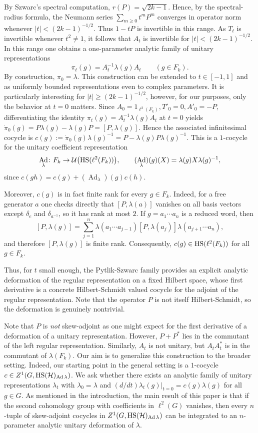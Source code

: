\documentclass[12pt]{amsproc}
\theoremstyle{plain}
\theoremstyle{definition}
\numberwithin{equation}{section}
\newcommand{\HS}{{\rm HS}}
\DeclareMathOperator{\Ad}{Ad}
\begin{document}
By Szwarc's spectral computation, \(r(P)=\sqrt{2k-1}\). Hence, by the
spectral-radius formula, the Neumann series
$
\sum_{m\ge 0} t^m P^m
$
converges in operator norm whenever \(|t|<(2k-1)^{-1/2}\). Thus
\(1-tP\) is invertible in this range.
As $T_t$ is invertible whenever $t^2\neq 1$, it follows that $A_t$ is invertible for
$
|t|<(2k-1)^{-1/2}.
$
In this range one obtains a one-parameter analytic family of unitary representations
\[
\pi_t(g)=A_t^{-1}\lambda(g)A_t \qquad (g\in F_k).
\]
By construction, $\pi_0=\lambda$. This construction can be extended to $t \in [-1,1]$ and as uniformly bounded representations even to complex parameters. It is particularly interesting for $|t| \geq (2k-1)^{-1/2}$, however, for our purposes, only the behavior at $t=0$ matters.
Since
$
A_0=1_{\ell^2(F_k)},  T'_0=0, A'_0=-P,
$
differentiating the identity
$
\pi_t(g)=A_t^{-1}\lambda(g)A_t
$
at $t=0$ yields
$
\dot\pi_0(g)=P\lambda(g)-\lambda(g)P=[P,\lambda(g)].
$
Hence the associated infinitesimal cocycle is
$
c(g):=\dot\pi_0(g)\lambda(g)^{-1}
      =P-\lambda(g)P\lambda(g)^{-1}.
$
This is a $1$-cocycle for the unitary coefficient representation
\[
\Ad_\lambda \colon F_k \to \mathcal U\bigl({\rm HS}(\ell^2(F_k))\bigr),\qquad
(\Ad_\lambda)(g)(X)=\lambda(g)X\lambda(g)^{-1},
\]
since
$
c(gh)=c(g)+(\Ad_\lambda)(g)c(h).
$

Moreover, $c(g)$ is in fact finite rank for every $g\in F_k$.
Indeed, for a free generator $a$ one checks directly that $[P,\lambda(a)]$ vanishes on all basis vectors except $\delta_e$ and $\delta_{a^{-1}}$, so it has rank at most $2$.
If $g=a_1\cdots a_n$ is a reduced word, then
\[
[P,\lambda(g)]
=
\sum_{j=1}^n
\lambda(a_1\cdots a_{j-1})[P,\lambda(a_j)]\lambda(a_{j+1}\cdots a_n),
\]
and therefore $[P,\lambda(g)]$ is finite rank.
Consequently,
$
c(g)\in {\rm HS}(\ell^2(F_k))$ for all $g\in F_k.
$

Thus, for $t$ small enough, the Pytlik-Szwarc family provides an explicit analytic deformation of the regular representation on a fixed Hilbert space, whose first derivative is a concrete Hilbert-Schmidt valued cocycle for the adjoint of the regular representation. Note that the operator $P$ is not itself Hilbert-Schmidt, so the deformation is genuinely nontrivial.

Note that $P$ is \emph{not} skew-adjoint as one might expect for the first derivative of a deformation of a unitary representation. However, $P+P^*$ lies in the commutant of the left regular representation. Similarly, $A_t$ is not unitary, but $A_tA_t^*$ is in the commutant of $\lambda(F_k)$. Our aim is to generalize this construction to the broader setting. Indeed, our starting point in the general setting is  a $1$-cocycle $c\in Z^1(G,\HS(\mathcal H)_{\Ad\lambda})$. We ask whether there exists an analytic family of unitary representations $\lambda_t$ with $\lambda_0=\lambda$ and $(d/dt) \lambda_t(g)|_{t=0}=c(g)\lambda(g)$ for all $g\in G$. As mentioned in the introduction, the main result of this paper is that if the second cohomology group with coefficients in $\ell^2(G)$ vanishes, then every $n$-tuple of skew-adjoint cocycles in $Z^1(G,\HS(\mathcal H)_{\Ad\lambda})$ can be integrated to an $n$-parameter analytic unitary deformation of $\lambda$.
\end{document}
